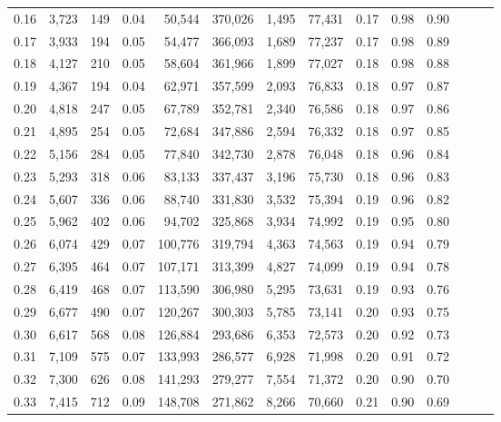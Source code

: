 \begin{tabular}{rrrrrrrrrrrrrr}
0.16 &   3,723 &    149 &  0.04 &   50,544 &  370,026 &   1,495 &  77,431 &  0.17 &  0.98 &      0.90 \\
0.17 &   3,933 &    194 &  0.05 &   54,477 &  366,093 &   1,689 &  77,237 &  0.17 &  0.98 &      0.89 \\
0.18 &   4,127 &    210 &  0.05 &   58,604 &  361,966 &   1,899 &  77,027 &  0.18 &  0.98 &      0.88 \\
0.19 &   4,367 &    194 &  0.04 &   62,971 &  357,599 &   2,093 &  76,833 &  0.18 &  0.97 &      0.87 \\
0.20 &   4,818 &    247 &  0.05 &   67,789 &  352,781 &   2,340 &  76,586 &  0.18 &  0.97 &      0.86 \\
0.21 &   4,895 &    254 &  0.05 &   72,684 &  347,886 &   2,594 &  76,332 &  0.18 &  0.97 &      0.85 \\
0.22 &   5,156 &    284 &  0.05 &   77,840 &  342,730 &   2,878 &  76,048 &  0.18 &  0.96 &      0.84 \\
0.23 &   5,293 &    318 &  0.06 &   83,133 &  337,437 &   3,196 &  75,730 &  0.18 &  0.96 &      0.83 \\
0.24 &   5,607 &    336 &  0.06 &   88,740 &  331,830 &   3,532 &  75,394 &  0.19 &  0.96 &      0.82 \\
0.25 &   5,962 &    402 &  0.06 &   94,702 &  325,868 &   3,934 &  74,992 &  0.19 &  0.95 &      0.80 \\
0.26 &   6,074 &    429 &  0.07 &  100,776 &  319,794 &   4,363 &  74,563 &  0.19 &  0.94 &      0.79 \\
0.27 &   6,395 &    464 &  0.07 &  107,171 &  313,399 &   4,827 &  74,099 &  0.19 &  0.94 &      0.78 \\
0.28 &   6,419 &    468 &  0.07 &  113,590 &  306,980 &   5,295 &  73,631 &  0.19 &  0.93 &      0.76 \\
0.29 &   6,677 &    490 &  0.07 &  120,267 &  300,303 &   5,785 &  73,141 &  0.20 &  0.93 &      0.75 \\
0.30 &   6,617 &    568 &  0.08 &  126,884 &  293,686 &   6,353 &  72,573 &  0.20 &  0.92 &      0.73 \\
0.31 &   7,109 &    575 &  0.07 &  133,993 &  286,577 &   6,928 &  71,998 &  0.20 &  0.91 &      0.72 \\
0.32 &   7,300 &    626 &  0.08 &  141,293 &  279,277 &   7,554 &  71,372 &  0.20 &  0.90 &      0.70 \\
0.33 &   7,415 &    712 &  0.09 &  148,708 &  271,862 &   8,266 &  70,660 &  0.21 &  0.90 &      0.69 \\

\end{tabular}
